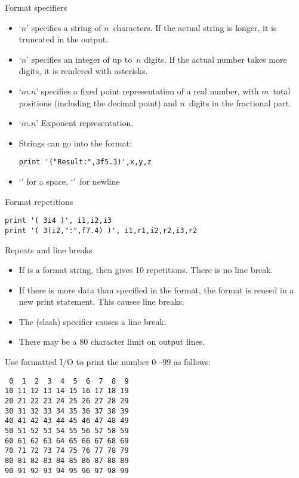 \begin{slide}{Format specifiers}
  \label{sl:formatspec}
  \begin{itemize}
  \item `$n$' specifies a string of $n$~characters. If the actual
    string is longer, it is truncated in the output.
  \item `$n$' specifies an integer of up to~$n$ digits. If the actual
    number takes more digits, it is rendered with asterisks.
  \item `$m.n$' specifies a fixed point representation of a real
    number, with $m$~total positions (including the decimal point)
    and $n$~digits in the fractional part.
  \item `$m.n$' Exponent representation.
  \item Strings can go into the format:
\begin{lstlisting}
print '("Result:",3f5.3)',x,y,z
\end{lstlisting}
\item `' for a space, `\n{/}'~for newline
  \end{itemize}
\end{slide}

\begin{block}{Format repetitions}
  \label{sl:fformat-rep}
\begin{lstlisting}
print '( 3i4 )', i1,i2,i3
print '( 3(i2,":",f7.4) )', i1,r1,i2,r2,i3,r2
\end{lstlisting}
\end{block}

\begin{block}{Repeats and line breaks}
  \label{sl:formatrepeat}
  \begin{itemize}
  \item If  is a format string, then  gives 10
    repetitions. There is no line break.
  \item If there is more data than specified in the format, the format
    is reused in a new print statement. This causes line breaks.
  \item The \n{/} (slash) specifier causes a line break.
  \item There may be a 80 character limit on output lines.
  \end{itemize}
\end{block}

\begin{exercise}
  \label{ex:f99}
  Use formatted I/O to print the number $0\cdots99$ as follows:
\begin{lstlisting}
 0  1  2  3  4  5  6  7  8  9
10 11 12 13 14 15 16 17 18 19
20 21 22 23 24 25 26 27 28 29
30 31 32 33 34 35 36 37 38 39
40 41 42 43 44 45 46 47 48 49
50 51 52 53 54 55 56 57 58 59
60 61 62 63 64 65 66 67 68 69
70 71 72 73 74 75 76 77 78 79
80 81 82 83 84 85 86 87 88 89
90 91 92 93 94 95 96 97 98 99
\end{lstlisting}
\end{exercise}

